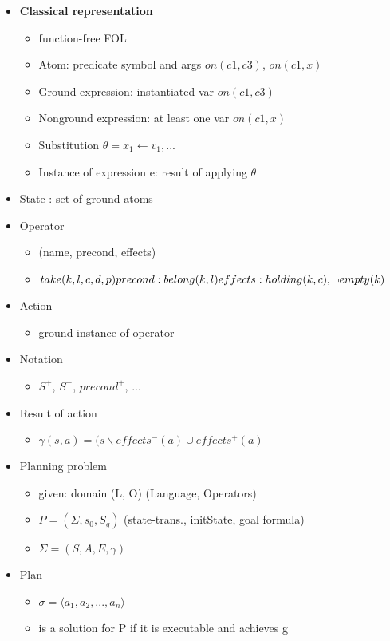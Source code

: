 \begin{itemize}
\item \textbf{Classical representation}

	\begin{itemize}
	\item function-free FOL
	\item Atom: predicate symbol and args $on(c1,c3)$, $on(c1,x)$
	\item Ground expression: instantiated var $on(c1,c3)$
	\item Nonground expression: at least one var $on(c1,x)$
	\item Substitution $\theta = {x_1 \leftarrow v_1, ... }$ 
	\item Instance of expression e: result of applying $\theta$ 
	\end{itemize}
\item State : set of ground atoms

\item Operator
	\begin{itemize}
	\item (name, precond, effects)
	\item $take(k,l,c,d,p) \\ precond: belong(k,l) \\ effects: holding(k,c), \neg empty(k) $
	\end{itemize}
	
\item Action
	\begin{itemize}
	\item ground instance of operator
	\end{itemize}
	
\item Notation
	\begin{itemize}
	\item $S^+$, $S^-$, $precond^+$, ...
	\end{itemize}

\item Result of action
	\begin{itemize}
	\item $\gamma (s,a) = ( s \backslash effects^-(a) \cup effects^+(a)$
	\end{itemize}

\item Planning problem
	\begin{itemize}
	\item given: domain (L, O) (Language, Operators)
	\item $P = (\Sigma,s_0,S_g)$ (state-trans., initState, goal formula)
	\item $\Sigma = (S,A,E,\gamma)$
	\end{itemize}

\item Plan
	\begin{itemize}
	\item $\sigma = \langle a_1,a_2,...,a_n \rangle$
	\item is a solution for P if it is executable and achieves g
	\end{itemize}
	
\end{itemize}

